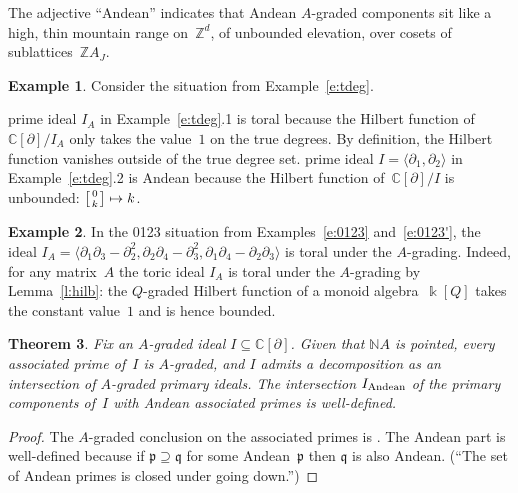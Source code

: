 \documentclass[12pt]{amsart}
\numberwithin{equation}{section}
\newtheorem{thm}{Theorem}[section]
\theoremstyle{definition}
\newtheorem{example}[thm]{Example}
\begin{document}
The adjective ``Andean'' indicates that Andean $A$-graded components
sit like a high, thin mountain range on~${\mathbb{Z}}^d$, of unbounded
elevation, over cosets of sublattices~${\mathbb{Z}} A_J$.

\begin{example}\label{e:1100toralAndean}
Consider the situation from Example~\ref{e:tdeg}.
\begin{enumerate}
\itemThe prime ideal $I_A$ in Example~\ref{e:tdeg}.1 is toral because the
Hilbert function of~${\mathbb{C}}[{\partial}]/I_A$ only takes the value~$1$ on the
true degrees.  By definition, the Hilbert function vanishes outside of
the true degree set.
\itemThe prime ideal $I = {\langle}{\partial}_1,{\partial}_2{\rangle}$ in Example~\ref{e:tdeg}.2 is
Andean because the Hilbert function of~${\mathbb{C}}[{\partial}]/I$ is unbounded:
$\bigl[{{{\genfrac{}{}{0pt}{1}{{\scriptstyle {0}}}{{\scriptstyle {k}}}}}}\bigr] \mapsto k$.
\end{enumerate}
\end{example}

\begin{example}\label{e:0123toral}
In the 0123 situation from Examples~\ref{e:0123} and~\ref{e:0123'},
the ideal $I_A = {\langle}{\partial}_1{\partial}_3 - {\partial}_2^2, {\partial}_2{\partial}_4 - {\partial}_3^2,
{\partial}_1{\partial}_4 - {\partial}_2{\partial}_3{\rangle}$ is toral under the $A$-grading.
Indeed, for any matrix~$A$ the toric ideal $I_A$ is toral under the
$A$-grading by Lemma~\ref{l:hilb}: the $Q$-graded Hilbert function of
a monoid algebra~${\Bbbk}[Q]$ takes the constant value~$1$ and is hence
bounded.
\end{example}

\begin{thm}\label{t:toralAndean}
Fix an $A$-graded ideal $I \subseteq {\mathbb{C}}[{\partial}]$.  Given that ${\mathbb{N}} A$
is pointed, every associated prime of~$I$ is $A$-graded, and $I$
admits a decomposition as an intersection of $A$-graded primary
ideals.  The intersection $I_{\text{\rm Andean}}$ of the primary components of~$I$
with Andean associated primes is well-defined.
\end{thm}
\begin{proof}
The $A$-graded conclusion on the associated primes is
\cite[Proposition~8.11]{cca}.  The Andean part is well-defined because
if ${\mathfrak{p}} \supseteq {\mathfrak{q}}$ for some Andean~${\mathfrak{p}}$ then ${\mathfrak{q}}$ is also
Andean.  (``The set of Andean primes is closed under going down.'')
\end{proof}
\end{document}
